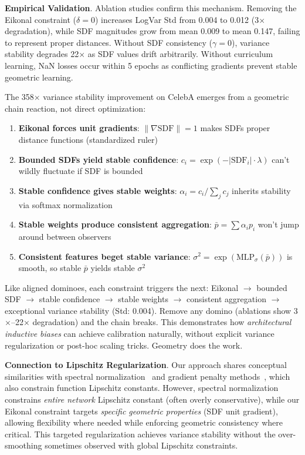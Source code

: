 \documentclass[10pt,twocolumn,letterpaper]{article}
\begin{document}
\textbf{Empirical Validation}. Ablation studies confirm this mechanism. Removing the Eikonal constraint ($\delta=0$) increases LogVar Std from 0.004 to 0.012 (3$\times$ degradation), while SDF magnitudes grow from mean 0.009 to mean 0.147, failing to represent proper distances. Without SDF consistency ($\gamma=0$), variance stability degrades 22$\times$ as SDF values drift arbitrarily. Without curriculum learning, NaN losses occur within 5 epochs as conflicting gradients prevent stable geometric learning.

\begin{intuitionbox}
The 358$\times$ variance stability improvement on CelebA emerges from a geometric chain reaction, not direct optimization:
\begin{enumerate}
\item \textbf{Eikonal forces unit gradients}: $\|\nabla \text{SDF}\| = 1$ makes SDFs proper distance functions (standardized ruler)
\item \textbf{Bounded SDFs yield stable confidence}: $c_i = \exp(-|\text{SDF}_i| \cdot \lambda)$ can't wildly fluctuate if SDF is bounded
\item \textbf{Stable confidence gives stable weights}: $\alpha_i = c_i / \sum_j c_j$ inherits stability via softmax normalization
\item \textbf{Stable weights produce consistent aggregation}: $\bar{p} = \sum \alpha_i p_i$ won't jump around between observers
\item \textbf{Consistent features beget stable variance}: $\sigma^2 = \exp(\text{MLP}_\sigma(\bar{p}))$ is smooth, so stable $\bar{p}$ yields stable $\sigma^2$
\end{enumerate}
Like aligned dominoes, each constraint triggers the next: Eikonal $\to$ bounded SDF $\to$ stable confidence $\to$ stable weights $\to$ consistent aggregation $\to$ exceptional variance stability (Std: 0.004). Remove any domino (ablations show 3$\times$--22$\times$ degradation) and the chain breaks. This demonstrates how \textit{architectural inductive biases} can achieve calibration naturally, without explicit variance regularization or post-hoc scaling tricks. Geometry does the work.
\end{intuitionbox}

\textbf{Connection to Lipschitz Regularization}. Our approach shares conceptual similarities with spectral normalization~\cite{miyato2018spectral} and gradient penalty methods~\cite{gulrajani2017improved}, which also constrain function Lipschitz constants. However, spectral normalization constrains \textit{entire network} Lipschitz constant (often overly conservative), while our Eikonal constraint targets \textit{specific geometric properties} (SDF unit gradient), allowing flexibility where needed while enforcing geometric consistency where critical. This targeted regularization achieves variance stability without the over-smoothing sometimes observed with global Lipschitz constraints.
\end{document}
